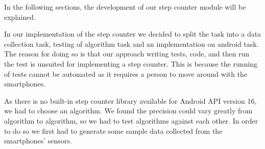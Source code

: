In the following sections, the development of our step counter module will be explained.

In our implementation of the step counter we decided to split the task into a data collection task, testing of algorithm task and an implementation on android task. The reason for doing so is that our approach writing tests, code, and then run the test is unsuited for implementing a step counter. This is because the running of tests cannot be automated as it requires a person to move around with the smartphones.

As there is no built-in step counter library available for Android API version 16, we had to choose an algorithm. We found the precision could vary greatly from algorithm to algorithm, so we had to test algorithms against each other. In order to do so we first had to generate some sample data collected from the smartphones' sensors.